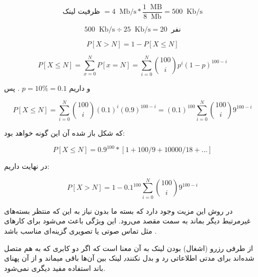\newcommand{\unit}[1]{
	\ \text{ #1}
}

\problem{}

\problem{}
\begin{equation*}
	\text{ظرفیت لینک }= 4 \unit{ Mb/s} * \frac{1 \unit{ MB}}{8 \unit{ Mb}} = 500 \unit{ Kb/s}
\end{equation*}

\subproblem{}

\begin{equation*}
	500 \unit{ Kb/s} \div 25 \unit{ Kb/s} = 20 \unit { نفر}
\end{equation*}


\subproblem{}

\begin{equation*}
	P [X > N] = 1 - P [X \leq N]
\end{equation*}

\begin{equation*}
	P [X \leq N] = \sum_{x=0}^{N} P[x = N] = \sum_{i=0}^{N} {100 \choose i} p^i (1-p)^{100-i}
\end{equation*}

و داریم 
$p = 10\% = 0.1$
.	 
پس

\begin{equation*}
	P [X \leq N] = \sum_{i=0}^{N} {100 \choose i} (0.1)^i (0.9)^{100-i} = (0.1)^{100} \sum_{i=0}^{N} {100 \choose i} 9^{100-i}
\end{equation*}
	
که شکل باز شده آن این گونه خواهد بود:

\begin{equation*}
	P [X \leq N] = 0.9^{100} * [1 + 100/9 + 10000/18 + ...]
\end{equation*}

در نهایت داریم:

\begin{equation*}
	P [X > N] = 1 - 0.1^{100} \sum_{i=0}^{N} {100 \choose i} 9^{100-i} 
\end{equation*}

\subproblem{}
در روش 
این مزیت وجود دارد که بسته ما بدون نیاز به این 
که منتظر بسته‌های غیرمرتبط دیگر بماند به سمت مقصد می‌رود.
این ویژگی باعث می‌شود برای کارهای
مثل تماس‌ صوتی یا تصویری
گزینه‌ای مناسب باشد
.

از طرفی رزرو (اشغال) بودن لینک به آن معنا است که اگر دو کابری که به هم متصل شده‌اند برای مدتی اطلاعاتی
رد و بدل نکنند٫ لینک بین آن‌ها 
باقی میماند و از آن پهنای باند استفاده مفید دیگری نمی‌شود. 

